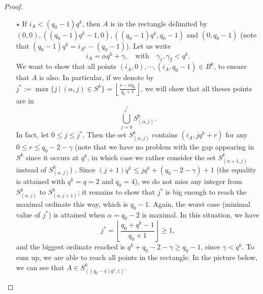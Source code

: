 \documentclass[a4paper]{article}
\begin{document}
\begin{proof}
\begin{itemize}
    \item[$\star$] If $i_A < (q_0-1)q^k$, then $A$ is in the rectangle delimited by $(0,0), ((q_0-1)q^k-1,0), ((q_0-1)q^k,q_0-1)$ and $(0,q_0-1)$ (note that $(q_0-1)q^k=i_{A^k}-(q_0-1)$). Let us write
    \[i_A = \alpha q^k+\gamma, \quad \mathrm{with} \quad \gamma_1,\gamma_2 < q^k.\]
    We want to show that all points $(i_A,0),\cdots,(i_A,q_0-1) \in B^k$, to ensure that $A$ is also. In particular, if we denote by $j^*:=\max \{j \ | \ (\alpha,j) \in S^k\} = \left\lfloor \frac{s-\alpha q_0}{q_0+1}\right\rfloor$, we will show that all theses points are in 
    \[\bigcup_{j=0}^{j^*} S^k_{(\alpha,j)}.\]
    In fact, let $0 \leq j \leq j^*$. Then the set $ S^k_{(\alpha,j)}$ contains $(i_A,jq^k+r)$ for any $0 \leq r \leq q_0-2-\gamma$ (note that we have no problem with the gap appearing in $S^k$ since it occurs at $q^k$, in which case we rather consider the set  $ S^k_{(\alpha+1,j)}$ instead of  $ S^k_{(\alpha,j)}$) . Since $(j+1)q^k \leq jq^k + (q_0-2-\gamma)+1$ (the equality is attained with $q^k=q=2$ and $q_0=4$), we do not miss any integer from $S^k_{(\alpha,j)}$ to $S^k_{(\alpha,j+1)}$; it remains to show that $j^*$ is big enough to reach the maximal ordinate this way, which is $q_0-1$. Again, the worst case (minimal value of $j^*$) is attained when $\alpha = q_0-2$ is maximal. In this situation, we have 
    \[j^* = \left\lfloor \dfrac{q_0+q^k-1}{q_0+1}\right\rfloor \geq 1,\]
    and the biggest ordinate reached is $q^k+q_0-2-\gamma \geq q_0-1$, since $\gamma < q^k$. To sum up, we are able to reach all points in the rectangle. In the picture below, we can see that $A \in S^k_{((q_0-4)q^k,1)}$. 

\begin{figure}[h]
\begin{center}
\end{center}
\end{figure}
\end{itemize}
\end{proof}
\end{document}
